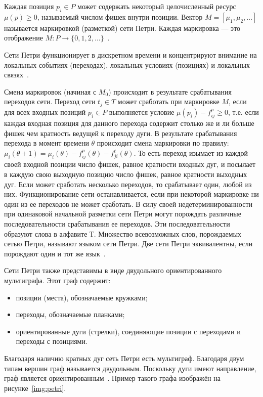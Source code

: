 Каждая позиция $p_i \in P$ может содержать некоторый целочисленный ресурс $\mu(p) \ge 0$, называемый числом фишек внутри позиции. Вектор $M = [\mu_1, \mu_2, \ldots]$ называется маркировкой (разметкой) сети Петри. Каждая маркировка --- это отображение $M: P \rightarrow \{0,1,2,\ldots\}$~\cite{petri}. 

Сети Петри функционирует в дискретном времени и концентрируют внимание на локальных событиях (переходах), локальных условиях (позициях) и локальных связях~\cite{petri}.

Смена маркировок (начиная с $M_0$) происходит в результате срабатывания переходов сети. Переход сети $t_j \in T$ может сработать при маркировке $M$, если для всех входных позиций $p_i \in P$ выполняется условие $\mu(p_i) - f_{ij}^p \ge 0$, т.е. если каждая входная позиция для данного перехода содержит столько же и ли больше фишек чем кратность ведущей к переходу дуги. В результате срабатывания перехода в момент времени $\theta$ происходит смена маркировки по правилу: $\mu_i(\theta + 1) = \mu_i(\theta) - f_{ij}^p(\theta) -  f_{ji}^t(\theta)$. То есть переход изымает из каждой своей входной позиции число фишек, равное кратности входных дуг, и посылает в каждую свою выходную позицию число фишек, равное кратности выходных дуг. Если может сработать несколько переходов, то срабатывает один, любой из них. Функционирование сети останавливается, если при некоторой маркировке ни один из ее переходов не может сработать. В силу своей недетерминированности при одинаковой начальной разметки сети Петри могут порождать различные последовательности срабатывания ее переходов. Эти последовательности образуют слова в алфавите Т. Множество всевозможных слов, порождаемых сетью Петри, называют языком сети Петри. Две сети Петри эквивалентны, если порождают один и тот же язык~\cite{petri}. 

Сети Петри также представимы в виде двудольного ориентированного мультиграфа. Этот граф содержит:
\begin{itemize}[label=---]
	\item позиции (места), обозначаемые кружками;
	\item переходы, обозначаемые планками;
	\item ориентированные дуги (стрелки), соединяющие позиции с переходами и переходы с позициями.
\end{itemize}
Благодаря наличию кратных дуг сеть Петри есть мультиграф. Благодаря двум типам вершин граф называется двудольным. Поскольку дуги имеют направление, граф является ориентированным~\cite{petri}. Пример такого графа изображён на рисунке~\ref{img:petri}.

